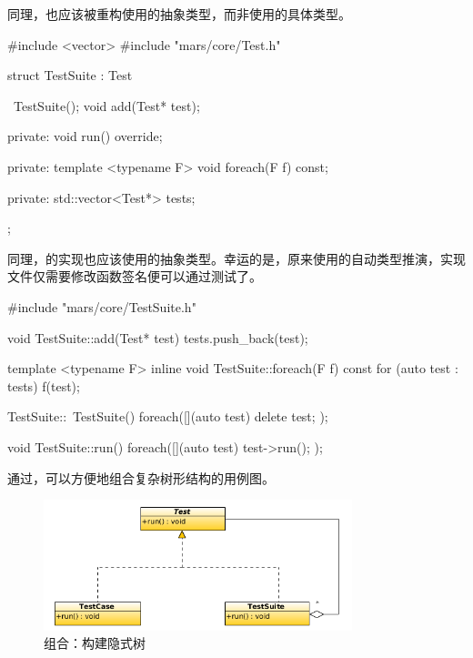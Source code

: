 \begin{content}
同理，也应该被重构使用的抽象类型，而非使用的具体类型。

\begin{leftbar}
 \begin{c++}[caption={\ttfamily{include/mars/core/TestSuite.h}}]
#include <vector>
#include "mars/core/Test.h"

struct TestSuite : Test {
  ~TestSuite();
  void add(Test* test);

private:
  void run() override;

private:
  template <typename F>
  void foreach(F f) const;

private:
  std::vector<Test*> tests;
};
 \end{c++}
\end{leftbar}

同理，的实现也应该使用的抽象类型。幸运的是，原来使用的自动类型推演，实现文件仅需要修改函数签名便可以通过测试了。

\begin{leftbar}
 \begin{c++}[caption={\ttfamily{src/mars/core/TestSuite.cc}}]
#include "mars/core/TestSuite.h"

void TestSuite::add(Test* test) {
  tests.push_back(test);
}

template <typename F>
inline void TestSuite::foreach(F f) const {
  for (auto test : tests) {
    f(test);
  }
}

TestSuite::~TestSuite() {
  foreach([](auto test) {
    delete test;
  });
}

void TestSuite::run() {
  foreach([](auto test) {
    test->run();
  });
}
 \end{c++}
\end{leftbar}

通过，可以方便地组合复杂树形结构的用例图。

\begin{figure}[H]
\centering
\includegraphics[width=0.8\textwidth]{figures/xunit/test-tree.png}
\caption{组合：构建隐式树}
 \label{fig:test-tree}
\end{figure}


\end{content}
